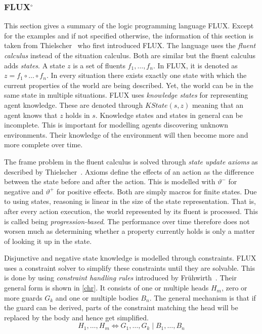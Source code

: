 \subsubsection[FLUX]{FLUX$^\circ$}\label{fun:apl_flux}
This section gives a summary of the logic programming language FLUX.
Except for the examples and if not specified otherwise, the information of this section is taken from Thielscher~\cite{thielscher_flux:_2005} who first introduced FLUX.
The language uses the \emph{fluent calculus} instead of the situation calculus.
Both are similar but the fluent calculus adds \emph{states}.
A state $z$ is a set of fluents $f_1,\dotsc,f_n$.
In FLUX, it is denoted as $z = f_1 \circ\dotsc\circ f_n$.
In every situation there exists exactly one state with which the current properties of the world are being described.
Yet, the world can be in the same state in multiple situations.
FLUX uses \emph{knowledge states} for representing agent knowledge.
These are denoted through $\textit{KState}(s,z)$ meaning that an agent knows that $z$ holds in $s$.
Knowledge states and states in general can be incomplete.
This is important for modelling agents discovering unknown environments.
Their knowledge of the environment will then become more and more complete over time.

The frame problem in the fluent calculus is solved through \emph{state update axioms} as described by Thielscher~\cite{thielscher_situation_1999}.
Axioms define the effects of an action as the difference between the state before and after the action.
This is modelled with $\vartheta^-$ for negative and $\vartheta^+$ for positive effects.
Both are simply macros for finite states.
Due to using states, reasoning is linear in the size of the state representation.
That is, after every action execution, the world represented by its fluent is processed.
This is called being \emph{progression-based}.
The performance over time therefore does not worsen much as determining whether a property currently holds is only a matter of looking it up in the state.

Disjunctive and negative state knowledge is modelled through constraints.
FLUX uses a constraint solver to simplify these constraints until they are solvable.
This is done by using \emph{constraint handling rules} introduced by Frühwirth~\cite{fruhwirth_theory_1998}.
Their general form is shown in \autoref{chr}.
It consists of one or multiple heads $H_m$, zero or more guards $G_k$ and one or multiple bodies $B_n$.
The general mechanism is that if the guard can be derived, parts of the constraint matching the head will be replaced by the body and hence get simplified.
\begin{equation}\label{chr}
  H_1,\ldots,H_m\Leftrightarrow G_1,\ldots,G_k \mid B_1,\ldots,B_n
\end{equation}

